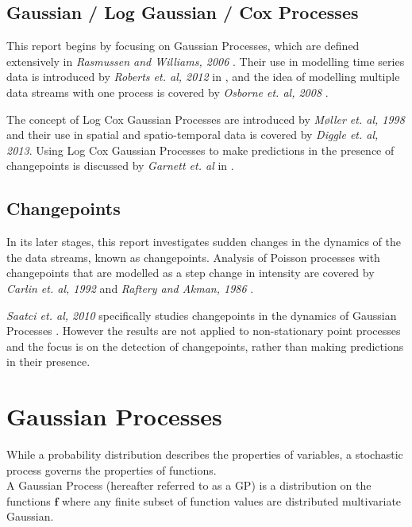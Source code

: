 \documentclass[a4paper,11pt]{report}
\begin{document}
\section{Gaussian / Log Gaussian / Cox Processes}
This report begins by focusing on Gaussian Processes, which are defined extensively in \textit{Rasmussen and Williams, 2006} \cite{GP4ML}. Their use in modelling time series data is introduced by \textit{Roberts et. al, 2012} in \cite{GP-robots}, and the idea of modelling multiple data streams with one process is covered by \textit{Osborne et. al, 2008} \cite{multi-outputGP}.

The concept of Log Cox Gaussian Processes are introduced by \textit{M\o ller et. al, 1998} \cite{LGCP-moller} and their use in spatial and spatio-temporal data is covered by \textit{Diggle et. al, 2013}\cite{LGCP-diggle}. Using Log Cox Gaussian Processes to make predictions in the presence of changepoints is discussed by \textit{Garnett et. al} in \cite{changepoint-prediction}.

\section{Changepoints}

In its later stages, this report investigates sudden changes in the dynamics of the the data streams, known as changepoints.  Analysis of Poisson processes with changepoints that are modelled as a step change in intensity are covered by \textit{Carlin et. al, 1992} \cite{carln-cp} and \textit{Raftery and Akman, 1986} \cite{akman-cp}.

\textit{Saatci et. al, 2010} specifically studies changepoints in the dynamics of Gaussian Processes \cite{saatci-cp}. However the results are not applied to non-stationary point processes and the focus is on the detection of changepoints, rather than making predictions in their presence.

\chapter{Gaussian Processes}

While a probability distribution describes the properties of variables, a stochastic process governs the properties of functions. \\

A Gaussian Process (hereafter referred to as a GP) is a distribution on the functions \(\mathbf{f}\) where any finite subset of function values are distributed multivariate Gaussian. 
\end{document}
